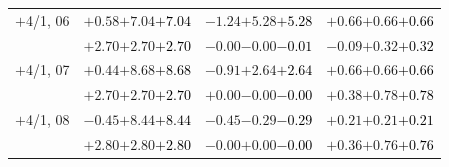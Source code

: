\documentclass[compress]{beamer}
\begin{document}
\begin{frame}
\begin{tabular}{r | c | c | c}
$+$4/1, 06 & $+0.58$\hspace{0.1 cm}$+7.04$\hspace{0.1 cm}\textcolor{black}{$+7.04$} & $-1.24$\hspace{0.1 cm}$+5.28$\hspace{0.1 cm}\textcolor{black}{$+5.28$} & $+0.66$\hspace{0.1 cm}$+0.66$\hspace{0.1 cm}\textcolor{black}{$+0.66$} \\
           & $+2.70$\hspace{0.1 cm}$+2.70$\hspace{0.1 cm}\textcolor{black}{$+2.70$} & $-0.00$\hspace{0.1 cm}$-0.00$\hspace{0.1 cm}\textcolor{black}{$-0.01$} & $-0.09$\hspace{0.1 cm}$+0.32$\hspace{0.1 cm}\textcolor{black}{$+0.32$} \\
$+$4/1, 07 & $+0.44$\hspace{0.1 cm}$+8.68$\hspace{0.1 cm}\textcolor{black}{$+8.68$} & $-0.91$\hspace{0.1 cm}$+2.64$\hspace{0.1 cm}\textcolor{black}{$+2.64$} & $+0.66$\hspace{0.1 cm}$+0.66$\hspace{0.1 cm}\textcolor{black}{$+0.66$} \\
           & $+2.70$\hspace{0.1 cm}$+2.70$\hspace{0.1 cm}\textcolor{black}{$+2.70$} & $+0.00$\hspace{0.1 cm}$-0.00$\hspace{0.1 cm}\textcolor{black}{$-0.00$} & $+0.38$\hspace{0.1 cm}$+0.78$\hspace{0.1 cm}\textcolor{black}{$+0.78$} \\
$+$4/1, 08 & $-0.45$\hspace{0.1 cm}$+8.44$\hspace{0.1 cm}\textcolor{black}{$+8.44$} & $-0.45$\hspace{0.1 cm}$-0.29$\hspace{0.1 cm}\textcolor{black}{$-0.29$} & $+0.21$\hspace{0.1 cm}$+0.21$\hspace{0.1 cm}\textcolor{black}{$+0.21$} \\
           & $+2.80$\hspace{0.1 cm}$+2.80$\hspace{0.1 cm}\textcolor{black}{$+2.80$} & $-0.00$\hspace{0.1 cm}$+0.00$\hspace{0.1 cm}\textcolor{black}{$-0.00$} & $+0.36$\hspace{0.1 cm}$+0.76$\hspace{0.1 cm}\textcolor{black}{$+0.76$} \\

\end{tabular}
\end{frame}
\end{document}
